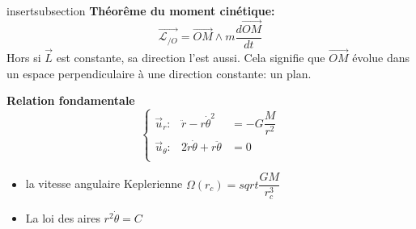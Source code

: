 \documentclass[10pt]{beamer}
\begin{document}
\begin{frame}
    \tableofcontents
\end{frame}

\begin{frame}{insertsubsection}
    \textbf{Théorême du moment cinétique:}
    \[\vec{\mathcal{L}_{/O}}=\vec{OM}\wedge m\frac{d\vec{OM}}{dt}\]
    Hors si $\vec{L}$ est constante, sa direction l'est aussi. Cela signifie que $\vec{OM}$ évolue dans un espace perpendiculaire à une direction constante: un plan.\medskip \pause
    
    \textbf{Relation fondamentale}
    \begin{equation}
        \left\{
        \begin{array}{lll}
            \vec{u}_r:& \ddot{r}-r\dot{\theta}^2 & = -G\dfrac{M}{r^2}\\
            \vec{u}_\theta:& 2\dot{r}\dot{\theta}+r\ddot{\theta} & = 0\\
        \end{array}\right.
    \end{equation}
    \begin{itemize}
        \item la vitesse angulaire Keplerienne $\Omega(r_c)=sqrt{\dfrac{GM}{r_c^3}}$
        \item La loi des aires $r^2\dot{\theta} = C$
    \end{itemize}
\end{frame}
\end{document}
